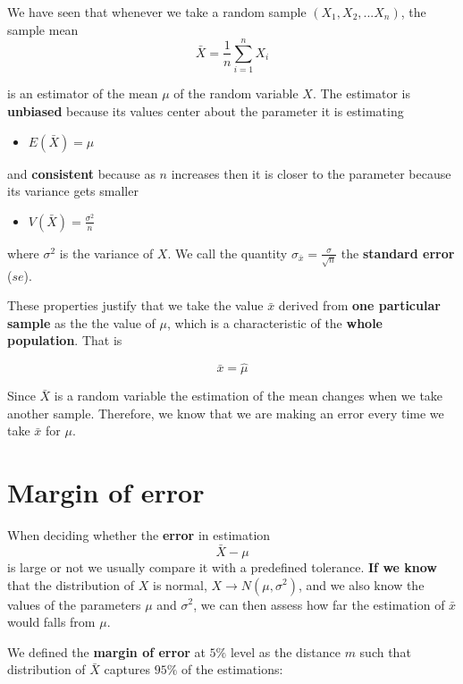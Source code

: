 \documentclass[
]{book}
\providecommand{\tightlist}{%
  \setlength{\itemsep}{0pt}\setlength{\parskip}{0pt}}
\begin{document}
We have seen that whenever we take a random sample \((X_1, X_2, ... X_n)\), the sample mean
\[\bar{X}=\frac{1}{n}\sum_{i=1}^n X_i\]

is an estimator of the mean \(\mu\) of the random variable \(X\). The estimator is \textbf{unbiased} because its values center about the parameter it is estimating

\begin{itemize}
\tightlist
\item
  \(E(\bar{X})=\mu\)
\end{itemize}

and \textbf{consistent} because as \(n\) increases then it is closer to the parameter because its variance gets smaller

\begin{itemize}
\tightlist
\item
  \(V(\bar{X})=\frac{\sigma^2}{n}\)
\end{itemize}

where \(\sigma^2\) is the variance of \(X\). We call the quantity \(\sigma_{\bar{x}}=\frac{\sigma}{\sqrt{n}}\) the \textbf{standard error} (\(se\)).

These properties justify that we take the value \(\bar{x}\) derived from \textbf{one particular sample} as the the value of \(\mu\), which is a characteristic of the \textbf{whole population}. That is

\[\bar{x}=\hat{\mu}\]

Since \(\bar{X}\) is a random variable the estimation of the mean changes when we take another sample. Therefore, we know that we are making an error every time we take \(\bar{x}\) for \(\mu\).

\hypertarget{margin-of-error-1}{%
\section{Margin of error}\label{margin-of-error-1}}

When deciding whether the \textbf{error} in estimation \[\bar{X}-\mu\] is large or not we usually compare it with a predefined tolerance. \textbf{If we know} that the distribution of \(X\) is normal, \(X \rightarrow N(\mu, \sigma^2)\), and we also know the values of the parameters \(\mu\) and \(\sigma^2\), we can then assess how far the estimation of \(\bar{x}\) would falls from \(\mu\).

We defined the \textbf{margin of error} at \(5\%\) level as the distance \(m\) such that distribution of \(\bar{X}\) captures \(95\%\) of the estimations:
\end{document}
